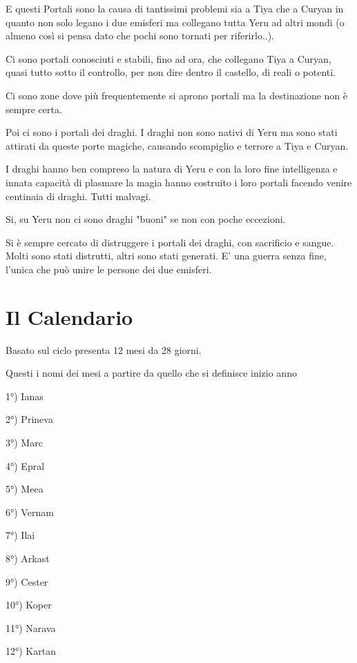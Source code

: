 \documentclass[a4paper,11pt,twoside,openany]{book}
\begin{document}
E questi Portali sono la causa di tantissimi problemi sia a Tiya che a Curyan in quanto non solo legano i due emisferi ma collegano tutta Yeru ad altri mondi (o almeno così si pensa dato che pochi sono tornati per riferirlo..).

Ci sono portali conosciuti e stabili, fino ad ora, che collegano Tiya a Curyan, quasi tutto sotto il controllo, per non dire dentro il castello, di reali o potenti.

Ci sono zone dove più frequentemente si aprono portali ma la destinazione non è sempre certa.

Poi ci sono i portali dei draghi. I draghi non sono nativi di Yeru ma sono stati attirati da queste porte magiche, causando scompiglio e terrore a Tiya e Curyan.

I draghi hanno ben compreso la natura di Yeru e con la loro fine intelligenza e innata capacità di plasmare la magia hanno costruito i loro portali facendo venire centinaia di draghi. Tutti malvagi.

Si, su Yeru non ci sono draghi "buoni" se non con poche eccezioni.

Si è sempre cercato di distruggere i portali dei draghi, con sacrificio e sangue. Molti sono stati distrutti, altri sono stati generati. E' una guerra senza fine, l'unica che può unire le persone dei due emisferi.

\pagebreak

\section{Il Calendario}

\label{il-calendario}

Basato sul ciclo presenta 12 mesi da 28 giorni.

Questi i nomi dei mesi a partire da quello che si definisce inizio
anno
\bigskip

1°) Ianas

2°) Prineva

3°) Marc

4°) Epral

5°) Meea

6°) Vernam

7°) Ilai

8°) Arkast

9°) Cester

10°) Koper

11°) Narava

12°) Kartan
\end{document}
